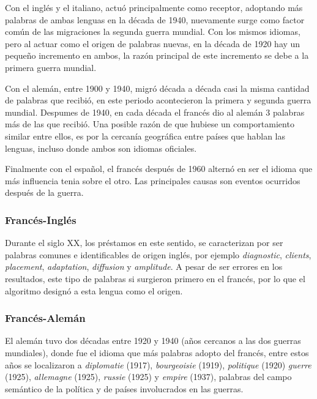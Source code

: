 Con el inglés y el italiano, actuó principalmente como receptor,  adoptando más palabras de ambas lenguas en la década de 1940, nuevamente surge como factor común de las migraciones la segunda guerra mundial. Con los mismos idiomas, pero al actuar como el origen de palabras nuevas, en la década de 1920 hay un pequeño incremento en ambos, la razón principal de este incremento se debe a la primera guerra mundial.  

Con el alemán, entre 1900 y 1940, migró década a década casi la misma cantidad de palabras que recibió, en este periodo acontecieron la primera y segunda guerra mundial.  Despumes de 1940,  en cada década el francés dio al alemán 3 palabras más de las que recibió. Una posible razón de que hubiese un comportamiento similar entre ellos, es por la cercanía geográfica entre países que hablan las lenguas, incluso donde ambos son  idiomas oficiales. 

Finalmente con el español, el francés después de 1960 alternó en ser el idioma que más influencia tenia sobre el otro. Las principales causas son eventos ocurridos después de la guerra. 




\subsubsection*{Francés-Inglés}%

Durante el siglo XX, los préstamos en este sentido, se caracterizan por ser palabras comunes e identificables de origen inglés,  por ejemplo  \textit{diagnostic}, \textit{clients}, \textit{placement}, \textit{adaptation}, \textit{diffusion} y \textit{amplitude}.  A pesar de ser errores en los resultados, este tipo de palabras si surgieron primero en el francés, por lo que el algoritmo designó a esta lengua como el origen. 

\subsubsection*{Francés-Alemán}%

El alemán tuvo dos décadas entre 1920 y 1940  (años cercanos a las dos guerras mundiales), donde  fue el idioma que más palabras adopto del francés, entre estos años se localizaron a \textit{diplomatie} (1917), \textit{bourgeoisie} (1919), \textit{politique} (1920)  \textit{guerre} (1925), \textit{allemagne} (1925), \textit{russie} (1925) y \textit{empire} (1937), palabras del campo semántico de la política y de países involucrados en las guerras. 



